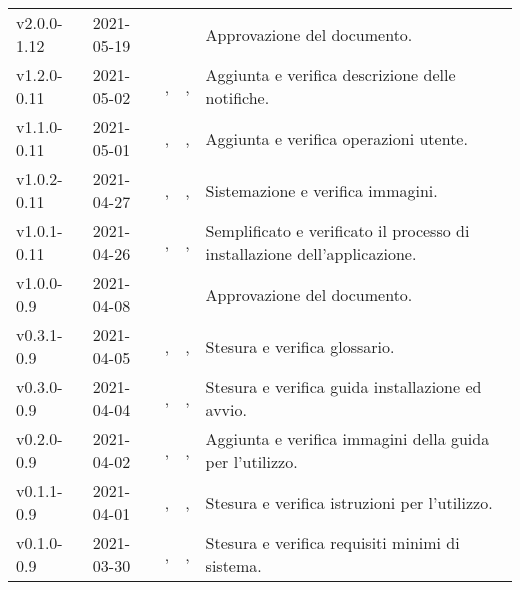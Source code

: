 {\begin{longtable}{C{.131777\freewidth} C{.134036\freewidth} C{.263554\freewidth} C{.188254\freewidth} C{.282379\freewidth}}
        v2.0.0-1.12 & 2021-05-19 & \Davide{} & \RdP{} & Approvazione del documento. \\
        v1.2.0-0.11 & 2021-05-02 & \Tommaso{},\newline{} \Lucrezia{} & \ver{},\newline{} \prog{} & Aggiunta e verifica descrizione delle notifiche. \\
        v1.1.0-0.11 & 2021-05-01 & \Francesco{},\newline{} \Lucrezia{} & \ver{},\newline{} \prog{} & Aggiunta e verifica operazioni utente. \\
        v1.0.2-0.11 & 2021-04-27 & \Giosue{},\newline{} \Daniele{} & \ver{},\newline{} \progr{} & Sistemazione e verifica immagini. \\
        v1.0.1-0.11 & 2021-04-26 & \Davide{},\newline{} \Lucrezia{} & \ver{},\newline{} \prog{} & Semplificato e verificato il processo di installazione dell'applicazione.\\
        v1.0.0-0.9 & 2021-04-08 & \Tommaso{} & \RdP{} & Approvazione del documento. \\
        v0.3.1-0.9 & 2021-04-05 & \Giosue{},\newline{} \Lucrezia{} & \ver{},\newline{} \prog{} & Stesura e verifica glossario. \\
        v0.3.0-0.9 & 2021-04-04 & \Giosue{},\newline{} \Daniele{} & \ver{},\newline{} \progr{} & Stesura e verifica guida installazione ed avvio. \\
        v0.2.0-0.9 & 2021-04-02 & \Davide{},\newline{} \Lucrezia{} & \ver{},\newline{} \prog{} & Aggiunta e verifica immagini della guida per l'utilizzo.\\
        v0.1.1-0.9 & 2021-04-01 & \Davide{},\newline{} \Daniele{} & \ver{},\newline{} \progr{} & Stesura e verifica istruzioni per l'utilizzo.\\
        v0.1.0-0.9 & 2021-03-30 & \Davide{},\newline{} \Daniele{} & \ver{},\newline{} \progr{} & Stesura e verifica requisiti minimi di sistema. \\

\end{longtable}}
